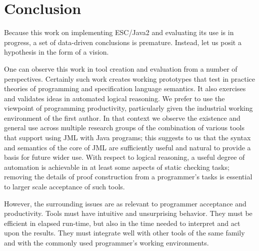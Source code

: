 \documentclass{sig-alternate}
\begin{document}
\section{Conclusion}


Because this work on implementing ESC/Java2 and evaluating its use is
in progress, a set of data-driven conclusions is premature.  Instead,
let us posit a hypothesis in the form of a vision.

One can observe this work in tool creation and evaluation from a
number of perspectives.  Certainly such work creates working
prototypes that test in practice theories of programming and
specification language semantics.  It also exercises and validates
ideas in automated logical reasoning.  We prefer to use the viewpoint
of programming productivity, particularly given the industrial working
environment of the first author.  In that context we observe the
existence and general use across multiple research groups of the
combination of various tools that support using JML with Java
programs; this suggests to us that the syntax and semantics of the
core of JML are sufficiently useful and natural to provide a basis for
future wider use.  With respect to logical reasoning, a useful degree
of automation is achievable in at least some aspects of static
checking tasks; removing the details of proof construction from a
programmer's tasks is essential to larger scale acceptance of such
tools.

However, the surrounding issues are as relevant to programmer
acceptance and productivity.  Tools must have intuitive and
unsurprising behavior. They must be efficient in elapsed run-time, but
also in the time needed to interpret and act upon the results.  They
must integrate well with other tools of the same family and with the
commonly used programmer's working environments.

\end{document}
